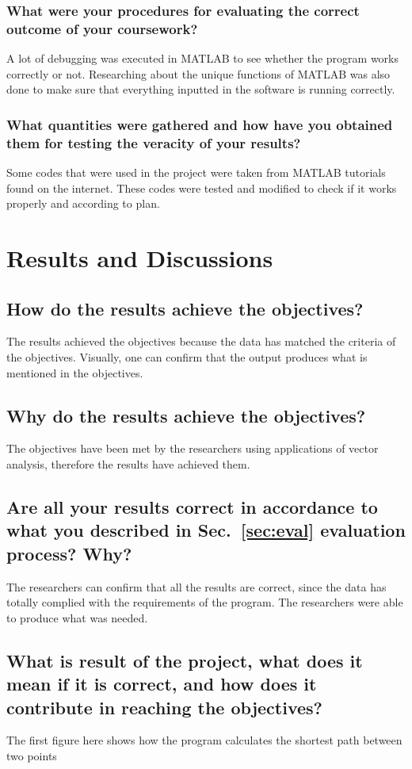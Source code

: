 \subsubsection{What were your procedures for evaluating the correct outcome of your coursework?}
A lot of debugging was executed in MATLAB to see whether the program works correctly or not. Researching about the unique functions of MATLAB was also done to make sure that everything inputted in the software is running correctly.
	
\subsubsection{What quantities were gathered and how have you obtained them for testing the veracity of your results?}

Some codes that were used in the project were taken from MATLAB tutorials found on the internet. These codes were tested and modified to check if it works properly and according to plan.


\section{Results and Discussions}

\subsection{How do the results achieve the objectives?}
The results achieved the objectives because the data has matched the criteria of the objectives. Visually, one can confirm that the output produces what is mentioned in the objectives.
\subsection{Why do the results achieve the objectives?}
The objectives have been met by the researchers using applications of vector analysis, therefore the results have achieved them.
	
\subsection{Are all your results correct  in accordance to what you described in Sec.~\ref{sec:eval} evaluation process? Why?} 
The researchers can confirm that all the results are correct, since the data has totally complied with the requirements of the program. The researchers were able to produce what was needed.
\subsection{What is result of the project, what does it mean if it is correct, and how does it contribute in reaching the objectives?}
The first figure here shows how the program calculates the shortest path between two points

